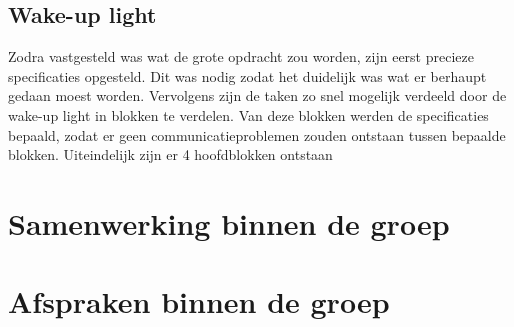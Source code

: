 \subsection{Wake-up light}
Zodra vastgesteld was wat de grote opdracht zou worden, zijn eerst precieze specificaties opgesteld. Dit was nodig zodat het duidelijk was wat er berhaupt gedaan moest worden. Vervolgens zijn de taken zo snel mogelijk verdeeld door de wake-up light in blokken te verdelen. Van deze blokken werden de specificaties bepaald, zodat er geen communicatieproblemen zouden ontstaan tussen bepaalde blokken. Uiteindelijk zijn er 4 hoofdblokken ontstaan

\section{Samenwerking binnen de groep}

\section{Afspraken binnen de groep}
